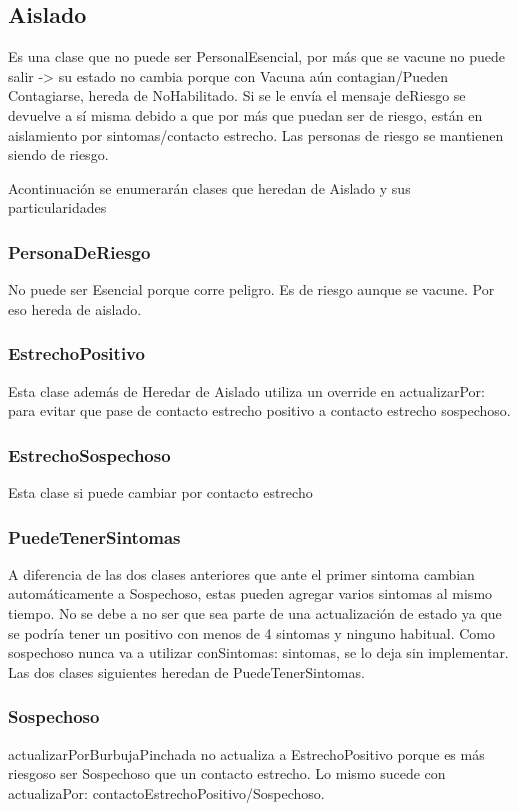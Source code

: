 \documentclass[titlepage,a4paper]{article}
\begin{document}
\subsection{Aislado}
Es una clase que no puede ser PersonalEsencial, por más que se vacune no puede salir -> su estado no cambia porque con Vacuna aún contagian/Pueden Contagiarse,  hereda de NoHabilitado. Si se le envía el mensaje deRiesgo se devuelve a sí misma debido a que por más que puedan ser de riesgo, están en aislamiento por sintomas/contacto estrecho.
Las personas de riesgo se mantienen siendo de riesgo.

Acontinuación se enumerarán clases que heredan de Aislado y sus particularidades

\subsubsection{PersonaDeRiesgo}
No puede ser Esencial porque corre peligro. Es de riesgo aunque se vacune. Por eso hereda de aislado. 

\subsubsection{EstrechoPositivo}
Esta clase además de Heredar de Aislado utiliza un override en actualizarPor: para evitar que pase de contacto estrecho positivo a contacto estrecho sospechoso.

\subsubsection{EstrechoSospechoso}
Esta clase si puede cambiar por contacto estrecho

\subsubsection{PuedeTenerSintomas}
A diferencia de las dos clases anteriores que ante el primer sintoma cambian automáticamente a Sospechoso, estas pueden agregar varios sintomas al mismo tiempo. No se debe a no ser que sea parte de una actualización de estado ya que se podría tener un positivo con menos de 4 sintomas y ninguno habitual. Como sospechoso nunca va a utilizar conSintomas: sintomas, se lo deja sin implementar.
Las dos clases siguientes heredan de PuedeTenerSintomas.


\subsubsection{Sospechoso}
actualizarPorBurbujaPinchada no actualiza a EstrechoPositivo porque es más riesgoso ser Sospechoso que un contacto estrecho. Lo mismo sucede con actualizaPor: contactoEstrechoPositivo/Sospechoso.
\end{document}
